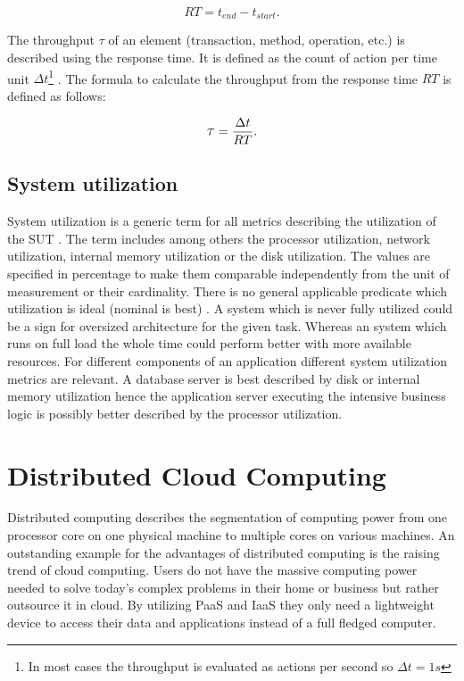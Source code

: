 \[
  RT = t_{end} - t_{start} .
\]

The throughput \large{$\tau$}\normalsize{} of an element (transaction, method, operation, etc.) is described using the response time. It is defined as the count of action per time unit $\Delta t$\footnote{In most cases the throughput is evaluated as actions per second so $\Delta t = 1s$} \cite[19]{lilja.2005}. The formula to calculate the throughput from the response time $RT$ is defined as follows:

\[
  \mathlarger{\tau} = \frac{\Delta t}{RT} .
\]

\subsection*{System utilization}
System utilization is a generic term for all metrics describing the utilization of the \acf{SUT} \cite[48]{jain.2008}. The term includes among others the processor utilization, network utilization, internal memory utilization or the disk utilization. The values are specified in percentage to make them comparable independently from the unit of measurement or their cardinality. There is no general applicable predicate which utilization is ideal (nominal is best) \cite[54]{jain.2008}. A system which is never fully utilized could be a sign for oversized architecture for the given task. Whereas an system which runs on full load the whole time could perform better with more available resources. For different components of an application different system utilization metrics are relevant. A database server is best described by disk or internal memory utilization hence the application server executing the intensive business logic is possibly better described by the processor utilization.

\section{Distributed Cloud Computing}
\label{sec:distributed-computing}
Distributed computing describes the segmentation of computing power from one processor core on one physical machine to multiple cores on various machines. An outstanding example for the advantages of distributed computing is the raising trend of cloud computing. Users do not have the massive computing power needed to solve today's complex problems in their home or business but rather outsource it in cloud. By utilizing \acf{PaaS} and \acf{IaaS} they only need a lightweight device to access their data and applications instead of a full fledged computer. \cite[1 - 2]{dikaiakos.2009}

